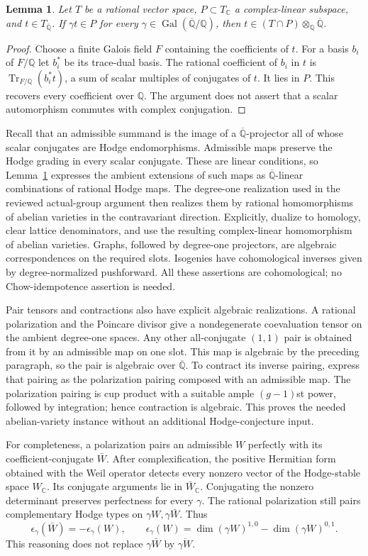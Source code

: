 \documentclass[11pt]{article}
\newcommand{\Q}{\mathbb Q}
\newcommand{\C}{\mathbb C}
\newcommand{\kk}{{\overline{\mathbb Q}}}
\DeclareMathOperator{\Gal}{Gal}
\DeclareMathOperator{\Tr}{Tr}
\newtheorem{lemma}[theorem]{Lemma}
\theoremstyle{remark}
\begin{document}
\begin{lemma}\label{lem:descent}
Let $T$ be a rational vector space, $P\subset T_\C$ a complex-linear
subspace, and $t\in T_\kk$. If $\gamma t\in P$ for every
$\gamma\in\Gal(\kk/\Q)$, then
$t\in(T\cap P)\otimes_\Q\kk$.
\end{lemma}
\begin{proof}
Choose a finite Galois field $F$ containing the coefficients of $t$.
For a basis $b_i$ of $F/\Q$ let $b_i^*$ be its trace-dual basis.
The rational coefficient of $b_i$ in $t$ is
$\Tr_{F/\Q}(b_i^*t)$, a sum of scalar multiples of conjugates of $t$.
It lies in $P$. This recovers every coefficient over $\Q$.
The argument does not assert that a scalar automorphism commutes with
complex conjugation.
\end{proof}

Recall that an admissible summand is the image of a $\kk$-projector all
of whose scalar conjugates are Hodge endomorphisms. Admissible maps
preserve the Hodge grading in every scalar conjugate. These are linear
conditions, so Lemma~\ref{lem:descent} expresses the ambient extensions
of such maps as $\kk$-linear combinations of rational Hodge maps.
The degree-one realization used in the reviewed actual-group argument
then realizes them by rational homomorphisms of abelian varieties in the
contravariant direction. Explicitly, dualize to homology, clear lattice
denominators, and use the resulting complex-linear homomorphism of
abelian varieties. Graphs, followed by degree-one projectors, are
algebraic correspondences on the required slots. Isogenies have
cohomological inverses given by degree-normalized pushforward.
All these assertions are cohomological; no Chow-idempotence assertion
is needed.

Pair tensors and contractions also have explicit algebraic realizations.
A rational polarization and the Poincare divisor give a nondegenerate
coevaluation tensor on the ambient degree-one spaces. Any other
all-conjugate $(1,1)$ pair is obtained from it by an admissible map on
one slot. This map is algebraic by the preceding paragraph, so the pair
is algebraic over $\kk$. To contract its inverse pairing, express that
pairing as the polarization pairing composed with an admissible map.
The polarization pairing is cup product with a suitable ample
$(g-1)$st power, followed by integration; hence contraction is algebraic.
This proves the needed abelian-variety instance without an additional
Hodge-conjecture input.

For completeness, a polarization pairs an admissible $W$ perfectly with
its coefficient-conjugate $\bar W$. After complexification, the positive
Hermitian form obtained with the Weil operator detects every nonzero
vector of the Hodge-stable space $W_\C$. Its conjugate arguments lie in
$\bar W_\C$. Conjugating the nonzero determinant preserves perfectness
for every $\gamma$. The rational polarization still pairs complementary
Hodge types on $\gamma W,\gamma\bar W$. Thus
\[
 \epsilon_\gamma(\bar W)=-\epsilon_\gamma(W),\qquad
 \epsilon_\gamma(W)=
 \dim(\gamma W)^{1,0}-\dim(\gamma W)^{0,1}.
 \tag{3}\label{eq:opposite}
\]
This reasoning does not replace $\gamma\bar W$ by $\overline{\gamma W}$.
\end{document}
